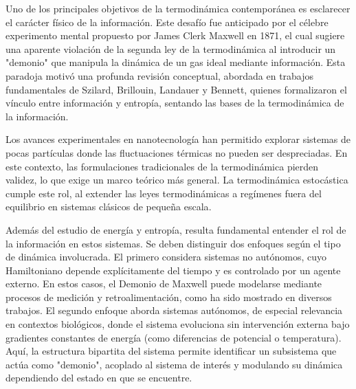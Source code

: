 %
%


Uno de los principales objetivos de la termodinámica contemporánea es esclarecer el carácter físico de la información. Este desafío fue anticipado por el célebre experimento mental propuesto por James Clerk Maxwell en 1871, el cual sugiere una aparente violación de la segunda ley de la termodinámica al introducir un "demonio" que manipula la dinámica de un gas ideal mediante información\cite{Maxwell_1871}. Esta paradoja motivó una profunda revisión conceptual, abordada en trabajos fundamentales de Szilard\cite{szilard1964decrease}, Brillouin\cite{brillouin1951maxwell}, Landauer\cite{Landauer_1961} y Bennett\cite{bennett1982thermodynamics}, quienes formalizaron el vínculo entre información y entropía, sentando las bases de la termodinámica de la información.

Los avances experimentales en nanotecnología han permitido explorar sistemas de pocas partículas donde las fluctuaciones térmicas no pueden ser despreciadas\cite{douarche2005experimental,wang2005experimental}. En este contexto, las formulaciones tradicionales de la termodinámica pierden validez, lo que exige un marco teórico más general. La termodinámica estocástica cumple este rol, al extender las leyes termodinámicas a regímenes fuera del equilibrio en sistemas clásicos de pequeña escala\cite{van2013stochastic,jarzynski1997nonequilibrium}.

Además del estudio de energía y entropía, resulta fundamental entender el rol de la información en estos sistemas. Se deben distinguir dos enfoques según el tipo de dinámica involucrada. El primero considera sistemas no autónomos, cuyo Hamiltoniano depende explícitamente del tiempo y es controlado por un agente externo. En estos casos, el Demonio de Maxwell puede modelarse mediante procesos de medición y retroalimentación, como ha sido mostrado en diversos trabajos\cite{cao2009thermodynamics,sagawa2010generalized}. El segundo enfoque aborda sistemas autónomos, de especial relevancia en contextos biológicos\cite{ehrich2023energy}, donde el sistema evoluciona sin intervención externa bajo gradientes constantes de energía (como diferencias de potencial o temperatura). Aquí, la estructura bipartita del sistema permite identificar un subsistema que actúa como "demonio", acoplado al sistema de interés y modulando su dinámica dependiendo del estado en que se encuentre.

